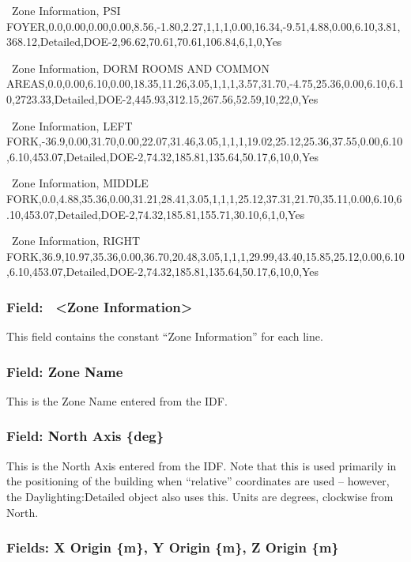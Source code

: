 ~Zone Information, PSI FOYER,0.0,0.00,0.00,0.00,8.56,-1.80,2.27,1,1,1,0.00,16.34,-9.51,4.88,0.00,6.10,3.81,368.12,Detailed,DOE-2,96.62,70.61,70.61,106.84,6,1,0,Yes

~Zone Information, DORM ROOMS AND COMMON AREAS,0.0,0.00,6.10,0.00,18.35,11.26,3.05,1,1,1,3.57,31.70,-4.75,25.36,0.00,6.10,6.10,2723.33,Detailed,DOE-2,445.93,312.15,267.56,52.59,10,22,0,Yes

~Zone Information, LEFT FORK,-36.9,0.00,31.70,0.00,22.07,31.46,3.05,1,1,1,19.02,25.12,25.36,37.55,0.00,6.10,6.10,453.07,Detailed,DOE-2,74.32,185.81,135.64,50.17,6,10,0,Yes

~Zone Information, MIDDLE FORK,0.0,4.88,35.36,0.00,31.21,28.41,3.05,1,1,1,25.12,37.31,21.70,35.11,0.00,6.10,6.10,453.07,Detailed,DOE-2,74.32,185.81,155.71,30.10,6,1,0,Yes

~Zone Information, RIGHT FORK,36.9,10.97,35.36,0.00,36.70,20.48,3.05,1,1,1,29.99,43.40,15.85,25.12,0.00,6.10,6.10,453.07,Detailed,DOE-2,74.32,185.81,135.64,50.17,6,10,0,Yes

\subsubsection{Field:~ \textless{}Zone Information\textgreater{}}\label{field-zone-information}

This field contains the constant ``Zone Information'' for each line.

\subsubsection{Field: Zone Name}\label{field-zone-name}

This is the Zone Name entered from the IDF.

\subsubsection{Field: North Axis \{deg\}}\label{field-north-axis-deg}

This is the North Axis entered from the IDF. Note that this is used primarily in the positioning of the building when ``relative'' coordinates are used -- however, the Daylighting:Detailed object also uses this. Units are degrees, clockwise from North.

\subsubsection{Fields: X Origin \{m\}, Y Origin \{m\}, Z Origin \{m\}}\label{fields-x-origin-m-y-origin-m-z-origin-m}

